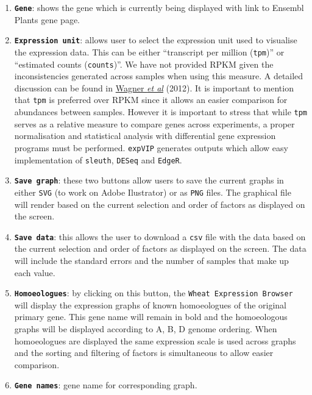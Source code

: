 \begin{enumerate}
\def\labelenumi{\arabic{enumi}.}
\item
  \textbf{\lstinline!Gene!}: shows the gene which is currently being
  displayed with link to Ensembl Plants gene page.
\item
  \textbf{\lstinline!Expression unit!}: allows user to select the
  expression unit used to visualise the expression data. This can be
  either ``transcript per million (\lstinline!tpm!)'' or ``estimated
  counts (\lstinline!counts!)''. We have not provided RPKM given the
  inconsistencies generated across samples when using this measure. A
  detailed discussion can be found in
  \href{http://www.ncbi.nlm.nih.gov/pubmed/22872506}{Wagner \emph{et
  al}} (2012). It is important to mention that \lstinline!tpm! is
  preferred over RPKM since it allows an easier comparison for
  abundances between samples. However it is important to stress that
  while \lstinline!tpm! serves as a relative measure to compare genes
  across experiments, a proper normalisation and statistical analysis
  with differential gene expression programs must be performed.
  \lstinline!expVIP! generates outputs which allow easy implementation
  of \lstinline!sleuth!, \lstinline!DESeq! and \lstinline!EdgeR!.
\item
  \textbf{\lstinline!Save graph!}: these two buttons allow users to save
  the current graphs in either \lstinline!SVG! (to work on Adobe
  Ilustrator) or as \lstinline!PNG! files. The graphical file will
  render based on the current selection and order of factors as
  displayed on the screen.
\item
  \textbf{\lstinline!Save data!}: this allows the user to download a
  \lstinline!csv! file with the data based on the current selection and
  order of factors as displayed on the screen. The data will include the
  standard errors and the number of samples that make up each value.
\item
  \textbf{\lstinline!Homoeologues!}: by clicking on this button, the
  \lstinline!Wheat Expression Browser! will display the expression
  graphs of known homoeologues of the original primary gene. This gene
  name will remain in bold and the homoeologous graphs will be displayed
  according to A, B, D genome ordering. When homoeologues are displayed
  the same expression scale is used across graphs and the sorting and
  filtering of factors is simultaneous to allow easier comparison.
\item
  \textbf{\lstinline!Gene names!}: gene name for corresponding graph.

\end{enumerate}
